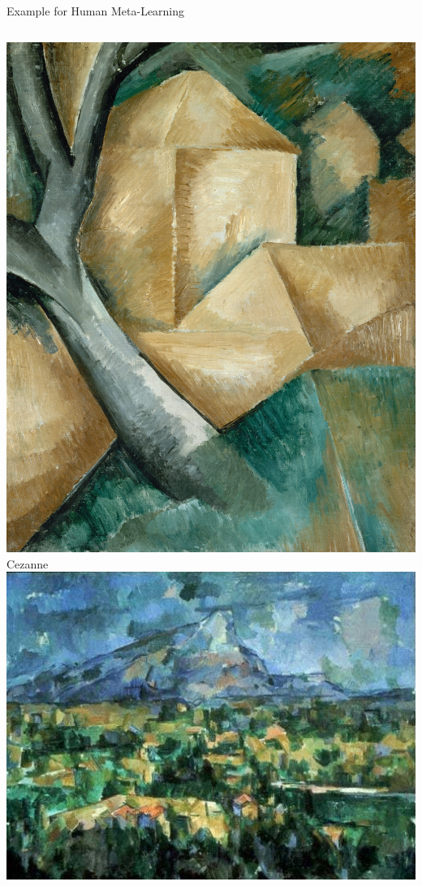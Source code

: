 \begin{frame}[c]{Example for Human Meta-Learning}
\begin{columns}
	\includegraphics[width=1.0\textwidth]{images/braque3.jpg}
	Cezanne
	\centering
	\includegraphics[width=1.0\textwidth]{images/cezanne1.jpg}

\end{columns}
\end{frame}
